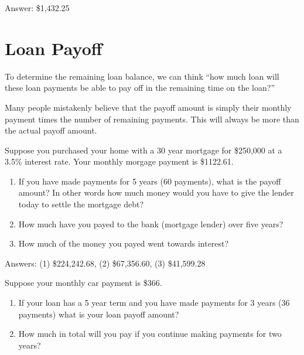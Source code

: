 \noindent Answer: \$1,432.25
\newpage

\section{Loan Payoff}%
\label{sec:loan-payoff}

To determine the remaining loan balance, we can think ``how much loan
will these loan payments be able to pay off in the remaining time on
the loan?''

\begin{note}
  Many people mistakenly believe that the payoff amount is simply
  their monthly payment times the number of remaining payments. This
  will always be more than the actual payoff amount.
\end{note}

\begin{exercise}
  Suppose you purchased your home with a 30 year mortgage for
  \$250,000 at a 3.5\% interest rate. Your monthly morgage payment is
  \$1122.61.

  \begin{enumerate}
  \item If you have made payments for 5 years (60 payments), what is
    the payoff amount? In other words how much money would you have to
    give the lender today to settle the mortgage debt?


  \item How much have you payed to the bank (mortgage lender) over
    five years?


  \item How much of the money you payed went towards interest?


  \end{enumerate}
\end{exercise}

\noindent Answers: (1) \$224,242.68, (2) \$67,356.60, (3) \$41,599.28

\newpage

\begin{exercise}
  Suppose your monthly car payment is \$366.

  \begin{enumerate}
  \item If your loan has a 5 year term and you have made payments for
    3 years (36 payments) what is your loan payoff amount?


  \item How much in total will you pay if you continue making payments
    for two years?


  \end{enumerate}
\end{exercise}


